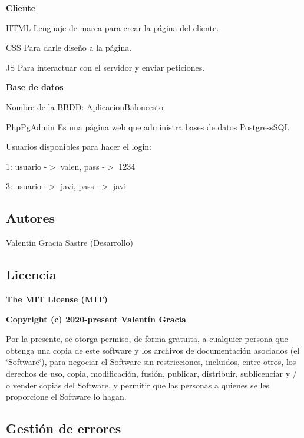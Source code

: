 {\bfseries Cliente}
\begin{DoxyItemize}
\item H\+T\+ML Lenguaje de marca para crear la página del cliente.
\item C\+SS Para darle diseño a la página.
\item JS Para interactuar con el servidor y enviar peticiones.
\end{DoxyItemize}

{\bfseries Base de datos}
\begin{DoxyItemize}
\item Nombre de la B\+B\+DD\+: Aplicacion\+Baloncesto
\item Php\+Pg\+Admin Es una página web que administra bases de datos Postgress\+S\+QL
\item Usuarios disponibles para hacer el login\+:
\item 1\+: usuario -\/$>$ valen, pass -\/$>$ 1234
\item 3\+: usuario -\/$>$ javi, pass -\/$>$ javi
\end{DoxyItemize}

\subsection*{Autores}


\begin{DoxyItemize}
\item Valentín Gracia Sastre (Desarrollo)
\end{DoxyItemize}

\subsection*{Licencia}

{\bfseries The M\+IT License (M\+IT)}

{\bfseries Copyright (c) 2020-\/present Valentín Gracia}

Por la presente, se otorga permiso, de forma gratuita, a cualquier persona que obtenga una copia de este software y los archivos de documentación asociados (el \char`\"{}\+Software\char`\"{}), para negociar el Software sin restricciones, incluidos, entre otros, los derechos de uso, copia, modificación, fusión, publicar, distribuir, sublicenciar y / o vender copias del Software, y permitir que las personas a quienes se les proporcione el Software lo hagan.

\subsection*{Gestión de errores}



